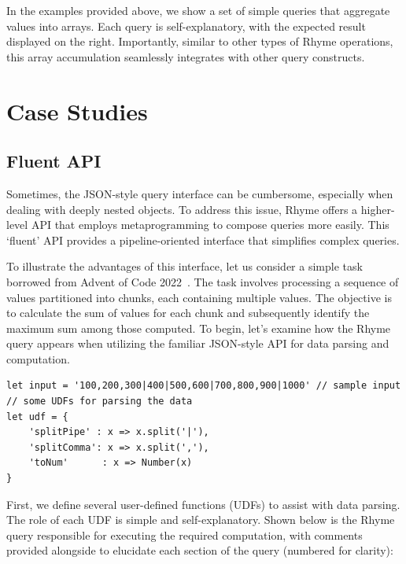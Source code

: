 \documentclass[runningheads]{llncs}
\newcommand{\lang}{Rhyme}
\begin{document}
In the examples provided above, we show a set of simple queries that aggregate values
into arrays.
Each query is self-explanatory, with the expected result displayed on the right.
Importantly, similar to other types of \lang{} operations, this array accumulation
seamlessly integrates with other query constructs.


\section{Case Studies}
\subsection{Fluent API}\label{subsec:fluent}
Sometimes, the JSON-style query interface can be cumbersome,
especially when dealing with deeply nested objects.
To address this issue, \lang{} offers a higher-level API that employs
metaprogramming to compose queries more easily.
This `fluent' API provides a pipeline-oriented interface that
simplifies complex queries.

To illustrate the advantages of this interface, let us consider a
simple task borrowed from Advent of Code 2022~\cite{adventofcode22}.
The task involves processing a sequence of values partitioned into chunks,
each containing multiple values.
The objective is to calculate the sum of values for each chunk and
subsequently identify the maximum sum among those computed.
To begin, let's examine how the \lang{} query appears when utilizing
the familiar JSON-style API for data parsing and computation.


\begin{lstlisting}[style=JavaScript, columns=flexible]
let input = '100,200,300|400|500,600|700,800,900|1000' // sample input
// some UDFs for parsing the data
let udf = {
    'splitPipe' : x => x.split('|'),
    'splitComma': x => x.split(','),
    'toNum'      : x => Number(x)
}
\end{lstlisting}

First, we define several user-defined functions (UDFs) to assist with data parsing.
The role of each UDF is simple and self-explanatory.
Shown below is the \lang{} query responsible for executing the required
computation, with comments provided alongside to elucidate each section
of the query (numbered for clarity):
\end{document}

